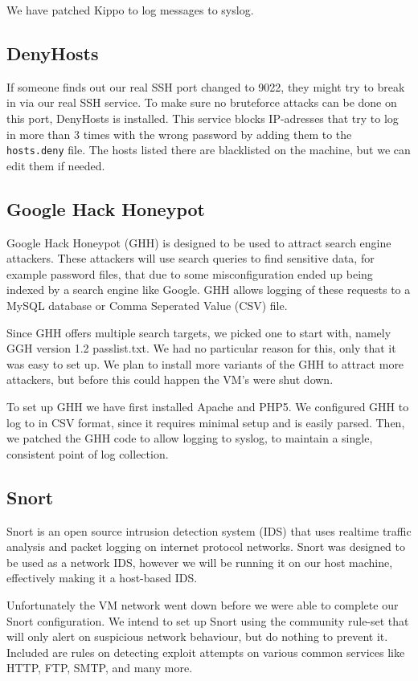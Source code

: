\documentclass[11pt]{article} %
\begin{document}
We have patched Kippo to log messages to syslog.

\subsection{DenyHosts}
If someone finds out our real SSH port changed to 9022, they might try to break in via our real SSH service.
To make sure no bruteforce attacks can be done on this port, DenyHosts is installed.
This service blocks IP-adresses that try to log in more than 3 times with the wrong password by adding them to the \verb|hosts.deny| file.
The hosts listed there are blacklisted on the machine, but we can edit them if needed.

\subsection{Google Hack Honeypot}
Google Hack Honeypot (GHH) is designed to be used to attract search engine attackers. 
These attackers will use search queries to find sensitive data, for example password files, that due to some misconfiguration ended up being indexed by a search engine like Google.
GHH allows logging of these requests to a MySQL database or Comma Seperated Value (CSV) file.


Since GHH offers multiple search targets, we picked one to start with, namely GGH version 1.2 passlist.txt.
We had no particular reason for this, only that it was easy to set up. 
We plan to install more variants of the GHH to attract more attackers, but before this could happen the VM's were shut down.

To set up GHH we have first installed Apache and PHP5.
We configured GHH to log to in CSV format, since it requires minimal setup and is easily parsed.
Then, we patched the GHH code to allow logging to syslog, to maintain a single, consistent point of log collection.

\subsection{Snort}
Snort is an open source intrusion detection system (IDS) that uses realtime traffic analysis and packet logging on internet protocol networks.
Snort was designed to be used as a network IDS, however we will be running it on our host machine, effectively making it a host-based IDS.

Unfortunately the VM network went down before we were able to complete our Snort configuration.
We intend to set up Snort using the community rule-set that will only alert on suspicious network behaviour, but do nothing to prevent it. 
Included are rules on detecting exploit attempts on various common services like HTTP, FTP, SMTP, and many more.
\end{document}
